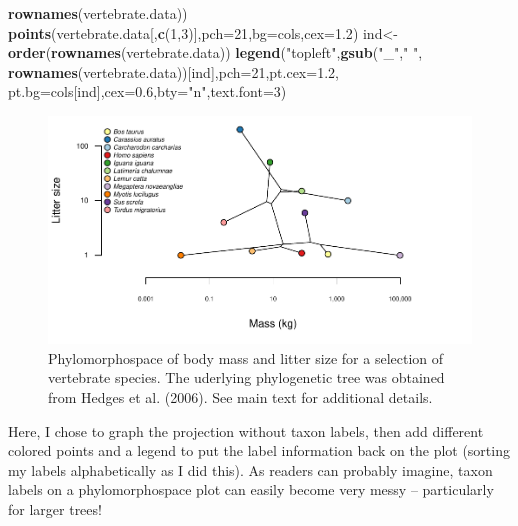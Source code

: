 \documentclass[fleqn,10pt,lineno]{wlpeerj} %
\newenvironment{Shaded}{\begin{snugshade}}{\end{snugshade}}
\newcommand{\AttributeTok}[1]{\textcolor[rgb]{0.13,0.29,0.53}{#1}}
\newcommand{\DecValTok}[1]{\textcolor[rgb]{0.00,0.00,0.81}{#1}}
\newcommand{\FloatTok}[1]{\textcolor[rgb]{0.00,0.00,0.81}{#1}}
\newcommand{\FunctionTok}[1]{\textcolor[rgb]{0.13,0.29,0.53}{\textbf{#1}}}
\newcommand{\NormalTok}[1]{#1}
\newcommand{\OtherTok}[1]{\textcolor[rgb]{0.56,0.35,0.01}{#1}}
\newcommand{\StringTok}[1]{\textcolor[rgb]{0.31,0.60,0.02}{#1}}
\begin{document}
\begin{Shaded}
\begin{Highlighting}[]
  \FunctionTok{rownames}\NormalTok{(vertebrate.data))}
\FunctionTok{points}\NormalTok{(vertebrate.data[,}\FunctionTok{c}\NormalTok{(}\DecValTok{1}\NormalTok{,}\DecValTok{3}\NormalTok{)],}\AttributeTok{pch=}\DecValTok{21}\NormalTok{,}\AttributeTok{bg=}\NormalTok{cols,}\AttributeTok{cex=}\FloatTok{1.2}\NormalTok{)}
\NormalTok{ind}\OtherTok{\textless{}{-}}\FunctionTok{order}\NormalTok{(}\FunctionTok{rownames}\NormalTok{(vertebrate.data))}
\FunctionTok{legend}\NormalTok{(}\StringTok{"topleft"}\NormalTok{,}\FunctionTok{gsub}\NormalTok{(}\StringTok{"\_"}\NormalTok{,}\StringTok{" "}\NormalTok{,}
  \FunctionTok{rownames}\NormalTok{(vertebrate.data))[ind],}\AttributeTok{pch=}\DecValTok{21}\NormalTok{,}\AttributeTok{pt.cex=}\FloatTok{1.2}\NormalTok{,}
  \AttributeTok{pt.bg=}\NormalTok{cols[ind],}\AttributeTok{cex=}\FloatTok{0.6}\NormalTok{,}\AttributeTok{bty=}\StringTok{"n"}\NormalTok{,}\AttributeTok{text.font=}\DecValTok{3}\NormalTok{)}
\end{Highlighting}
\end{Shaded}

\begin{figure}
\includegraphics[width=1\linewidth]{Revell.phytools-v2_peerj_files/figure-latex/vert-phylomorphospace-1} \caption{Phylomorphospace of body mass and litter size for a selection of vertebrate species. The uderlying phylogenetic tree was obtained from Hedges et al. (2006). See main text for additional details.}\label{fig:vert-phylomorphospace}
\end{figure}

Here, I chose to graph the projection without taxon labels, then add different colored points and a legend to put the label information back on the plot (sorting my labels alphabetically as I did this). As readers can probably imagine, taxon labels on a phylomorphospace plot can easily become very messy -- particularly for larger trees!
\end{document}
